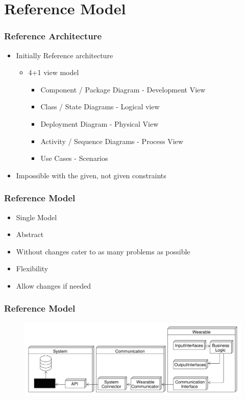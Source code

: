 \section{Reference Model}
\begin{frame}\frametitle{Reference Architecture}
	\begin{itemize}
		\item Initially Reference architecture
		\begin{itemize}
			\item 4+1 view model
			\begin{itemize}
				\item Component / Package Diagram - Development View
				\item Class / State Diagrams - Logical view
				\item Deployment Diagram - Physical View
				\item Activity / Sequence Diagrams - Process View
				\item Use Cases - Scenarios
			\end{itemize}
		\end{itemize}
	\end{itemize}
	\begin{itemize}
		\item<2> Impossible with the given, not given constraints
	\end{itemize}
\end{frame}
\begin{frame}\frametitle{Reference Model}
	\begin{itemize}
		\item Single Model
	\end{itemize}
	\begin{itemize}
		\item Abstract
		\item Without changes cater to as many problems as possible
		\item Flexibility
		\item Allow changes if needed
	\end{itemize}
\end{frame}
\begin{frame}\frametitle{Reference Model}
	\begin{figure}
		\includegraphics[width=\textwidth]{images/ReferenceModel}
	\end{figure}
\end{frame}
